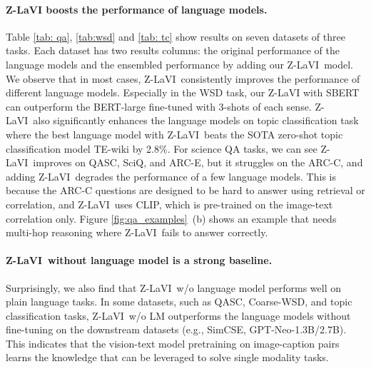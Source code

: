 \documentclass[11pt]{article}
\newcommand{\model}{Z-LaVI}
\begin{document}
\paragraph{Z-LaVI boosts the performance of language models.} Table \ref{tab: qa}, \ref{tab:wsd} and \ref{tab: tc} show results on seven datasets of three tasks. Each dataset has two results columns: the original performance of the language models and the ensembled performance by adding our \model~model. We observe that in most cases, \model~consistently improves the performance of different language models. Especially in the WSD task, our Z-LaVI with SBERT can outperform the BERT-large fine-tuned with 3-shots of each sense. \model~also significantly enhances the language models on topic classification task where the best language model with \model~beats the SOTA zero-shot topic classification model TE-wiki by 2.8\%. For science QA tasks, we can see \model~improves on QASC, SciQ, and ARC-E, but it struggles on the ARC-C, and adding \model~degrades the performance of a few language models. This is because the ARC-C questions are designed to be hard to answer using retrieval or correlation, and \model~uses CLIP, which is pre-trained on the image-text correlation only.
Figure \ref{fig:qa_examples}~(b) shows an example that needs multi-hop reasoning where \model~fails to answer correctly.

\paragraph{\model~without language model is a strong baseline.} Surprisingly, we also find that \model~w/o language model performs well on plain language tasks. In some datasets, such as QASC, Coarse-WSD, and topic classification tasks, \model~w/o LM outperforms the language models without fine-tuning on the downstream datasets (e.g., SimCSE, GPT-Neo-1.3B/2.7B). This indicates that the vision-text model pretraining on image-caption pairs learns the knowledge that can be leveraged to solve single modality tasks.
\end{document}
